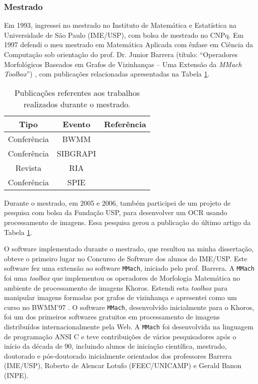 \subsubsection{Mestrado}

Em 1993, ingressei no mestrado no Instituto de Matemática e Estatística na Universidade de São Paulo (IME/USP), com bolsa de mestrado no CNPq. 
Em 1997 defendi o meu mestrado em Matemática Aplicada com ênfase em Ciência da Computação sob orientação do prof. Dr. Junior Barrera (título: ``Operadores Morfológicos Baseados em Grafos de Vizinhanças – Uma Extensão da \textit{MMach Toolbox}'') \cite{1997:Barrera.Zampirolli.ea}, com publicações relacionadas apresentadas na Tabela \ref{tab:tabelaM}.

\begin{table}[!ht]
   \centering
   \caption{Publicações referentes aos trabalhos realizados durante o mestrado.}\label{tab:tabelaM}
\begin{tabular}{|c|c|c|}
\hline
\textbf{Tipo} & \textbf{Evento} & \textbf{Referência} \\ \hline
  Conferência & BWMM &  \cite{1996:Zampirolli} \\ \hline
  Conferência & SIBGRAPI &  \cite{1997:Barrera.Zampirolli.ea} \\ \hline
  Revista & RIA &  \cite{2008:Zampirolli*1} \\ \hline
  Conferência & SPIE &  \cite{1998:Barrera.Terata.ea} \\ \hline
\end{tabular}
\end{table}

Durante o mestrado, em 2005 e 2006, também participei de um projeto de pesquisa com bolsa da Fundação USP, para desenvolver um OCR usando processamento de imagens. Essa pesquisa gerou a publicação do último artigo da Tabela \ref{tab:tabelaM}.

O software implementado durante o mestrado, que resultou na minha dissertação, obteve o primeiro lugar no Concurso de Software dos alunos do IME/USP. Este software fez uma extensão ao software \texttt{MMach}, iniciado pelo prof. Barrera. A \texttt{MMach} foi uma \textit{toolbox} que implementou os operadores de Morfologia Matemática no ambiente de processamento de imagens Khoros. Estendi esta \textit{toolbox} para manipular imagens formadas por grafos de vizinhança e apresentei como um curso no BWMM'97 \cite{zampirolli1997graph}. O software \texttt{MMach}, desenvolvido inicialmente para o Khoros, foi um dos primeiros softwares gratuitos em processamento de imagens distribuídos internacionalmente pela Web. A \texttt{MMach} foi desenvolvida  na linguagem de programação ANSI C e teve contribuições de vários pesquisadores após o início da década de 90, incluindo alunos de iniciação científica, mestrado, doutorado e pós-doutorado inicialmente orientados dos professores Barrera (IME/USP), Roberto de Alencar Lotufo (FEEC/UNICAMP) e Gerald Banon (INPE). 

